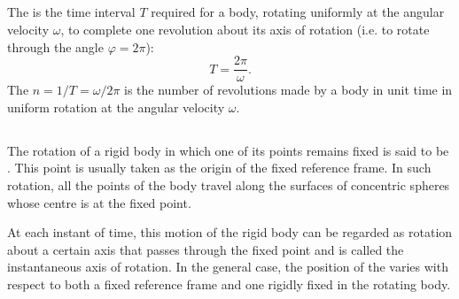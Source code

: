 \subsection{}\label{1.5.5} The  is the time interval $T$ required for a body, rotating uniformly at the angular velocity $\omega$, to com­plete one revolution about its axis of rotation (i.e. to rotate through the angle $\varphi = 2\pi$): 
\begin{equation*}%
T = \frac{2\pi}{\omega}.
\end{equation*}
The  $n = 1/T = \omega/2\pi$ is the number of revolutions made by a body in unit time in uniform rotation at the angular velocity $\omega$.

\subsection{}\label{1.5.6} The rotation of a rigid body in which one of its points remains fixed is said to be . This point is usually taken as the origin of the fixed reference frame. In such rotation, all the points of the body travel along the surfaces of concentric spheres whose centre is at the fixed point. 

At each instant of time, this motion of the rigid body can be regarded as rotation about a certain axis that passes through the fixed point and is called the instantaneous axis of rotation. In the general case, the position of the  varies with respect to both a fixed reference frame and one rigidly fixed in the rotating body.

